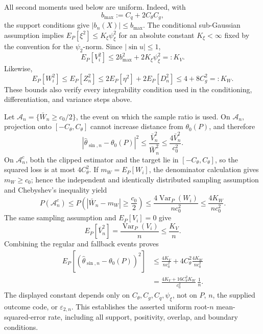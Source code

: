 All second moments used below are uniform.  Indeed, with
\[
b_{\max}:=C_q+2C_{\theta}C_g,
\]
the support conditions give \(|b_n(X)|\le b_{\max}\).  The conditional sub-Gaussian assumption implies \(E_P[\xi^2]\le K_{\xi}\psi_{\xi}^2\) for an absolute constant \(K_{\xi}<\infty\) fixed by the convention for the \(\psi_2\)-norm.  Since \(|\sin u|\le1\),
\[
E_P[V_i^2]
\le2b_{\max}^2+2K_{\xi}\psi_{\xi}^2
=:K_V.
\]
Likewise,
\[
E_P[W_i^2]
\le E_P[Z_n^2]
\le2E_P[\eta^2]+2E_P[D_n^2]
\le4+8C_g^2
=:K_W.
\]
These bounds also verify every integrability condition used in the conditioning, differentiation, and variance steps above.

Let \(\mathcal A_n=\{\bar W_n\ge c_0/2\}\), the event on which the sample ratio is used.  On \(\mathcal A_n\), projection onto \([-C_{\theta},C_{\theta}]\) cannot increase distance from \(\theta_0(P)\), and therefore
\[
|\widehat\theta_{\sin,n}-\theta_0(P)|^2
\le \frac{\bar V_n^2}{\bar W_n^2}
\le \frac{4\bar V_n^2}{c_0^2}.
\]
On \(\mathcal A_n^c\), both the clipped estimator and the target lie in \([-C_{\theta},C_{\theta}]\), so the squared loss is at most \(4C_{\theta}^2\).  If \(m_W=E_P[W_i]\), the denominator calculation gives \(m_W\ge c_0\); hence the independent and identically distributed sampling assumption and Chebyshev's inequality yield
\[
P(\mathcal A_n^c)
\le P\!\left(|\bar W_n-m_W|\ge\frac{c_0}{2}\right)
\le\frac{4\operatorname{Var}_P(W_i)}{nc_0^2}
\le\frac{4K_W}{nc_0^2}.
\]
The same sampling assumption and \(E_P[V_i]=0\) give
\[
E_P[\bar V_n^2]=\frac{\operatorname{Var}_P(V_i)}{n}\le\frac{K_V}{n}.
\]
Combining the regular and fallback events proves
\[
\begin{aligned}
E_P[(\widehat\theta_{\sin,n}-\theta_0(P))^2]
&\le \frac{4K_V}{nc_0^2}
+4C_{\theta}^2\frac{4K_W}{nc_0^2}\\
&=\frac{4K_V+16C_{\theta}^2K_W}{c_0^2}\,\frac1n.
\end{aligned}
\]
The displayed constant depends only on \(C_{\theta},C_g,C_q,\psi_{\xi}\), not on \(P\), \(n\), the supplied outcome code, or \(\varepsilon_{2,n}\).  This establishes the asserted uniform root-\(n\) mean-squared-error rate, including all support, positivity, overlap, and boundary conditions.
